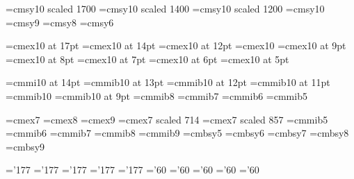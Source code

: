 % 

\font\seventeensy=cmsy10 scaled 1700
\font\fourteensy=cmsy10 scaled 1400
\font\twelvesy=cmsy10 scaled 1200
\font\tensy=cmsy10
\font\ninesy=cmsy9
\font\eightsy=cmsy8
\font\sixsy=cmsy6


% 

\font\seventeenex=cmex10 at 17pt
\font\fourteenex=cmex10 at 14pt
\font\twelveex=cmex10 at 12pt
\font\tenex=cmex10
\font\nineex=cmex10 at 9pt
\font\eightex=cmex10 at 8pt
\font\sevenex=cmex10 at 7pt
\font\sixex=cmex10 at 6pt
\font\fiveex=cmex10 at 5pt

% 

\font\fourteengp=cmmi10 at 14pt
\font\thirteengp=cmmib10 at 13pt
\font\twelvegp=cmmib10 at 12pt
\font\elevengp=cmmib10 at 11pt
\font\tengp=cmmib10
\font\ninegp=cmmib10 at 9pt
\font\eightgp=cmmib8
\font\sevengp=cmmib7
\font\sixgp=cmmib6
\font\fivegp=cmmib5

% 






\font\sevenex=cmex7
\font\eightex=cmex8
\font\nineex=cmex9
\font\fiveex=cmex7 scaled 714
\font\sixex=cmex7 scaled 857
\font\fivemib=cmmib5
\font\sixmib=cmmib6
\font\sevenmib=cmmib7
\font\eightmib=cmmib8
\font\ninemib=cmmib9
\font\fivebsy=cmbsy5
\font\sixbsy=cmbsy6
\font\sevenbsy=cmbsy7
\font\eightbsy=cmbsy8
\font\ninebsy=cmbsy9

\skewchar\fivemib='177
\skewchar\sixmib='177
\skewchar\sevenmib='177
\skewchar\eightmib='177
\skewchar\ninemib='177
\skewchar\fivebsy='60
\skewchar\sixbsy='60
\skewchar\sevenbsy='60
\skewchar\eightbsy='60
\skewchar\ninebsy='60

